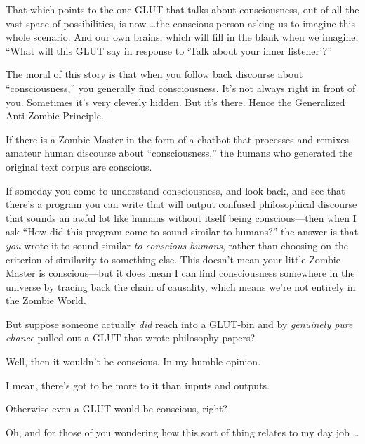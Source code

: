 {
 That which points to the one GLUT that talks about consciousness,
out of all the vast space of possibilities, is now \ldots the conscious
person asking us to imagine this whole scenario. And our own brains,
which will fill in the blank when we imagine, ``What
will this GLUT say in response to `Talk about your inner
listener'?''}

{
 The moral of this story is that when you follow back discourse
about ``consciousness,'' you
generally find consciousness. It's not always right in
front of you. Sometimes it's very cleverly hidden. But
it's there. Hence the Generalized Anti-Zombie
Principle.}

{
 If there is a Zombie Master in the form of a chatbot that
processes and remixes amateur human discourse about
``consciousness,'' the humans who
generated the original text corpus are conscious.}

{
 If someday you come to understand consciousness, and look back,
and see that there's a program you can write that will
output confused philosophical discourse that sounds an awful lot like
humans without itself being conscious---then when I ask
``How did this program come to sound similar to
humans?'' the answer is that \textit{you} wrote it to
sound similar \textit{to conscious humans}, rather than choosing on the
criterion of similarity to something else. This doesn't
mean your little Zombie Master is conscious---but it does mean I can
find consciousness somewhere in the universe by tracing back the chain
of causality, which means we're not entirely in the
Zombie World.}

{
 But suppose someone actually \textit{did} reach into a GLUT-bin
and by \textit{genuinely pure }\textit{chance} pulled out a GLUT that
wrote philosophy papers?}

{
 Well, then it wouldn't be conscious. In my humble
opinion.}

{
 I mean, there's got to be more to it than inputs
and outputs.}

{
 Otherwise even a GLUT would be conscious, right?}

{
 Oh, and for those of you wondering how this sort of thing relates
to my day job \ldots}

